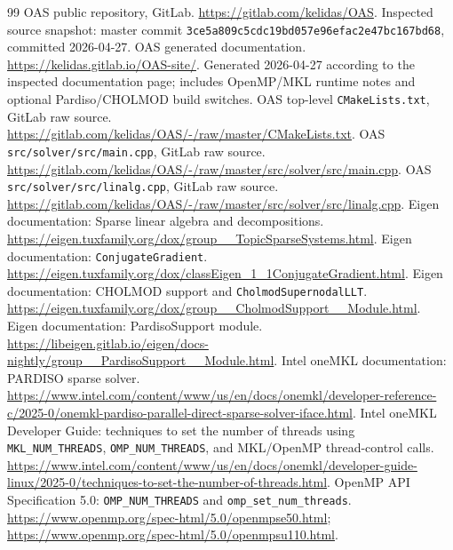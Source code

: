 \documentclass[10pt,a4paper]{article}
\newcommand{\code}[1]{\texttt{#1}}
\begin{document}
\begin{thebibliography}{99}
\small
{} OAS public repository, GitLab. \url{https://gitlab.com/kelidas/OAS}. Inspected source snapshot: master commit \code{3ce5a809c5cdc19bd057e96efac2e47bc167bd68}, committed 2026-04-27.
 OAS generated documentation. \url{https://kelidas.gitlab.io/OAS-site/}. Generated 2026-04-27 according to the inspected documentation page; includes OpenMP/MKL runtime notes and optional Pardiso/CHOLMOD build switches.
 OAS top-level \code{CMakeLists.txt}, GitLab raw source. \url{https://gitlab.com/kelidas/OAS/-/raw/master/CMakeLists.txt}.
 OAS \code{src/solver/src/main.cpp}, GitLab raw source. \url{https://gitlab.com/kelidas/OAS/-/raw/master/src/solver/src/main.cpp}.
 OAS \code{src/solver/src/linalg.cpp}, GitLab raw source. \url{https://gitlab.com/kelidas/OAS/-/raw/master/src/solver/src/linalg.cpp}.
 Eigen documentation: Sparse linear algebra and decompositions. \url{https://eigen.tuxfamily.org/dox/group__TopicSparseSystems.html}.
 Eigen documentation: \code{ConjugateGradient}. \url{https://eigen.tuxfamily.org/dox/classEigen_1_1ConjugateGradient.html}.
 Eigen documentation: CHOLMOD support and \code{CholmodSupernodalLLT}. \url{https://eigen.tuxfamily.org/dox/group__CholmodSupport__Module.html}.
 Eigen documentation: PardisoSupport module. \url{https://libeigen.gitlab.io/eigen/docs-nightly/group__PardisoSupport__Module.html}.
 Intel oneMKL documentation: PARDISO sparse solver. \url{https://www.intel.com/content/www/us/en/docs/onemkl/developer-reference-c/2025-0/onemkl-pardiso-parallel-direct-sparse-solver-iface.html}.
 Intel oneMKL Developer Guide: techniques to set the number of threads using \code{MKL\_NUM\_THREADS}, \code{OMP\_NUM\_THREADS}, and MKL/OpenMP thread-control calls. \url{https://www.intel.com/content/www/us/en/docs/onemkl/developer-guide-linux/2025-0/techniques-to-set-the-number-of-threads.html}.
 OpenMP API Specification 5.0: \code{OMP\_NUM\_THREADS} and \code{omp\_set\_num\_threads}. \url{https://www.openmp.org/spec-html/5.0/openmpse50.html}; \url{https://www.openmp.org/spec-html/5.0/openmpsu110.html}.


\end{thebibliography}
\end{document}
